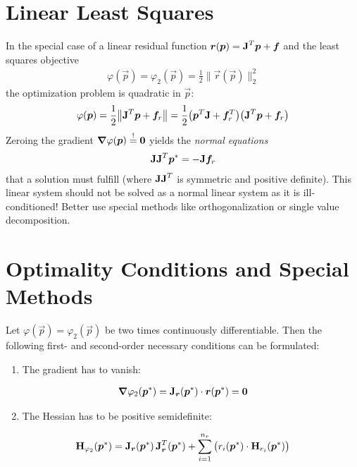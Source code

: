 	\section{Linear Least Squares}
		In the special case of a linear residual function \( \bm{r}(\bm{p}) = \bm{\mathrm{J}}^T \bm{p} + \bm{f} \) and the least squares objective
		\begin{align*}
			\varphi(\vec{p}) = \varphi_2(\vec{p}) = \frac{1}{2} \lVert \vec{r}(\vec{p}) \rVert_2^2
		\end{align*}
		the optimization problem is quadratic in \(\vec{p}\):
		\begin{align*}
			\varphi(\bm{p}) = \frac{1}{2} \big\lVert \bm{\mathrm{J}}^T \bm{p} + \bm{f}_r \big\rVert = \frac{1}{2} \big( \bm{p}^T \bm{\mathrm{J}} + \bm{f}_r^T \big) \big( \bm{\mathrm{J}}^T \bm{p} + \bm{f}_r \big)
		\end{align*}
		Zeroing the gradient \( \grad{\varphi}(\bm{p}) \overset{!}{=} \bm{0} \) yields the \emph{normal equations}
		\begin{align*}
			\bm{\mathrm{J}} \bm{\mathrm{J}}^T \bm{p}^\ast = -\bm{\mathrm{J}}\bm{f}_r
		\end{align*}
		that a solution must fulfill (where \( \bm{\mathrm{J}} \bm{\mathrm{J}}^T \) is symmetric and positive definite). This linear system should not be solved as a normal linear system as it is ill-conditioned! Better use special methods like orthogonalization or single value decomposition.

	\section{Optimality Conditions and Special Methods}
		Let \( \varphi(\vec{p}) = \varphi_2(\vec{p}) \) be two times continuously differentiable. Then the following first- and second-order necessary conditions can be formulated:
		\begin{enumerate}
			\item The gradient has to vanish:
		\end{enumerate}
		\begin{align*}
			\grad{\varphi_2}(\bm{p}^\ast) = \bm{\mathrm{J}}_{\bm{r}}(\bm{p}^\ast) \cdot \bm{r}(\bm{p}^\ast) = \bm{0}
		\end{align*}
		\begin{enumerate}
			\setcounter{enumi}{1}
			\item The Hessian has to be positive semidefinite:
		\end{enumerate}
		\begin{align}
			\bm{\mathrm{H}}_{\varphi_2}(\bm{p}^\ast) = \bm{\mathrm{J}}_{\bm{r}}(\bm{p}^\ast) \, \bm{\mathrm{J}}_{\bm{r}}^T(\bm{p}^\ast) + \sum_{i = 1}^{n_r} \big( r_i(\bm{p}^\ast) \cdot \bm{\mathrm{H}}_{r_i}(\bm{p}^\ast) \big)  \label{eq:leastSquaresHessian}
		\end{align}

